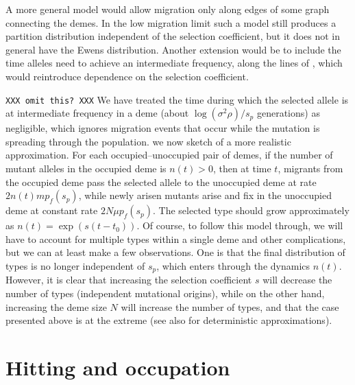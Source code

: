 \documentclass{article}
\begin{document}
A more general model would allow migration only along edges of some graph connecting the demes.
In the low migration limit such a model still produces a partition distribution independent of the selection coefficient,
but it does not in general have the Ewens distribution.
Another extension would be to include the time alleles need to achieve an intermediate frequency,
along the lines of \citet{Navarro:03}, which would reintroduce dependence on the selection coefficient.

\texttt{XXX omit this? XXX}
We have treated the time during which the selected allele is at intermediate frequency in a deme (about $\log(\sigma^2 \rho)/s_p$ generations) as negligible, 
which ignores migration events that occur while the mutation is spreading through the population. 
we now sketch of a more realistic approximation.
For each occupied--unoccupied pair of demes, if the number of mutant alleles in the occupied deme is $n(t)>0$,
then at time $t$, migrants from the occupied deme pass the selected allele to the unoccupied deme at rate $2 n(t) m p_f(s_p)$,
while newly arisen mutants arise and fix in the unoccupied deme at constant rate $2 N \mu p_f(s_p)$.
The selected type should grow approximately as $n(t)=\exp(s(t-t_0))$.
Of course, to follow this model through, we will have to account for multiple types within a single deme and other complications,
but we can at least make a few observations.
One is that the final distribution of types is no longer independent of $s_p$, which enters through the dynamics $n(t)$.
However, it is clear that increasing the selection coefficient $s$ will decrease the number of types (independent mutational origins),
while on the other hand, increasing the deme size $N$ will increase the number of types,
and that the case presented above is at the extreme (see also \cite{Navarro:03} for deterministic approximations). 

\section{Hitting and occupation}
\label{apx:hitting_occupation}
\end{document}
